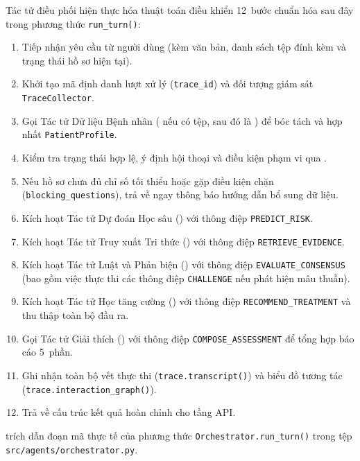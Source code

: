 Tác tử điều phối  hiện thực hóa thuật toán điều khiển 12~bước chuẩn hóa sau đây trong phương thức \texttt{run\_turn()}:
\begin{enumerate}
  \item Tiếp nhận yêu cầu từ người dùng (kèm văn bản, danh sách tệp đính kèm và trạng thái hồ sơ hiện tại).
  \item Khởi tạo mã định danh lượt xử lý (\texttt{trace\_id}) và đối tượng giám sát \texttt{TraceCollector}.
  \item Gọi Tác tử Dữ liệu Bệnh nhân ( nếu có tệp, sau đó là ) để bóc tách và hợp nhất \texttt{PatientProfile}.
  \item Kiểm tra trạng thái hợp lệ, ý định hội thoại và điều kiện phạm vi qua .
  \item Nếu hồ sơ chưa đủ chỉ số tối thiểu hoặc gặp điều kiện chặn (\texttt{blocking\_questions}), trả về ngay thông báo hướng dẫn bổ sung dữ liệu.
  \item Kích hoạt Tác tử Dự đoán Học sâu () với thông điệp \texttt{PREDICT\_RISK}.
  \item Kích hoạt Tác tử Truy xuất Tri thức () với thông điệp \texttt{RETRIEVE\_EVIDENCE}.
  \item Kích hoạt Tác tử Luật và Phản biện () với thông điệp \texttt{EVALUATE\_CONSENSUS} (bao gồm việc thực thi các thông điệp \texttt{CHALLENGE} nếu phát hiện mâu thuẫn).
  \item Kích hoạt Tác tử Học tăng cường () với thông điệp \texttt{RECOMMEND\_TREATMENT} và thu thập toàn bộ đầu ra.
  \item Gọi Tác tử Giải thích () với thông điệp \texttt{COMPOSE\_ASSESSMENT} để tổng hợp báo cáo 5~phần.
  \item Ghi nhận toàn bộ vết thực thi (\texttt{trace.transcript()}) và biểu đồ tương tác (\texttt{trace.interaction\_graph()}).
  \item Trả về cấu trúc kết quả hoàn chỉnh cho tầng API.
\end{enumerate}

 trích dẫn đoạn mã thực tế của phương thức \texttt{Orchestrator.run\_turn()} trong tệp \texttt{src/agents/orchestrator.py}.

